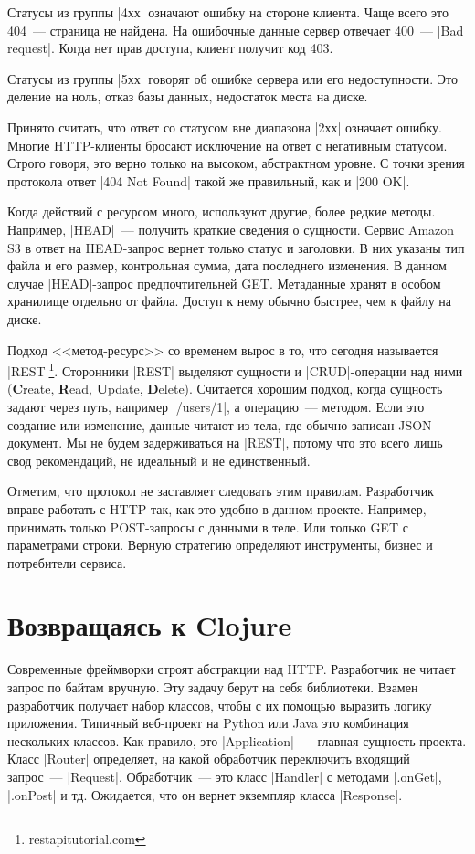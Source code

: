 Статусы из группы \spverb|4хх| означают ошибку на стороне клиента. Чаще всего это 404~---
страница не найдена. На ошибочные данные сервер отвечает 400~--- \spverb|Bad request|.
Когда нет прав доступа, клиент получит код 403.

Статусы из группы \spverb|5хх| говорят об ошибке сервера или его
недоступности. Это деление на ноль, отказ базы данных, недостаток места
на диске.

Принято считать, что ответ со статусом вне диапазона \spverb|2хх| означает
ошибку. Многие HTTP-клиенты бросают исключение на ответ с негативным статусом.
Строго говоря, это верно только на высоком, абстрактном уровне. С точки
зрения протокола ответ \spverb|404 Not Found| такой же правильный, как и \spverb|200 OK|.

Когда действий с ресурсом много, используют другие, более редкие
методы. Например, \spverb|HEAD|~--- получить краткие сведения о сущности. Сервис
Amazon S3 в ответ на HEAD-запрос вернет только статус и заголовки. В них указаны
тип файла и его размер, контрольная сумма, дата последнего изменения. В данном
случае \spverb|HEAD|-запрос предпочтительней GET. Метаданные хранят в особом
хранилище отдельно от файла. Доступ к нему обычно быстрее, чем к файлу на диске.

Подход <<метод-ресурс>> со временем вырос в то, что сегодня называется
\spverb|REST|\footnote{restapitutorial.com}. Сторонники
\spverb|REST| выделяют сущности и \spverb|CRUD|-операции над ними (\textbf{C}reate,
\textbf{R}ead, \textbf{U}pdate, \textbf{D}elete). Считается хорошим подход,
когда сущность задают через путь, например \spverb|/users/1|, а операцию~---
методом. Если это создание или изменение, данные читают из тела, где обычно записан
JSON-документ. Мы не будем задерживаться на \spverb|REST|, потому что это всего лишь
свод рекомендаций, не идеальный и не единственный.

Отметим, что протокол не заставляет следовать этим правилам. Разработчик вправе
работать с HTTP так, как это удобно в данном проекте. Например, принимать только
POST-запросы с данными в теле. Или только GET с параметрами строки. Верную
стратегию определяют инструменты, бизнес и потребители сервиса.

\section{Возвращаясь к Clojure}

Современные фреймворки строят абстракции над HTTP. Разработчик не читает запрос
по байтам вручную. Эту задачу берут на себя библиотеки. Взамен разработчик
получает набор классов, чтобы с их помощью выразить логику приложения. Типичный
веб-проект на Python или Java это комбинация нескольких классов. Как правило,
это \spverb|Application|~--- главная сущность проекта. Класс \spverb|Router|
определяет, на какой обработчик переключить входящий запрос~--- \spverb|Request|.
Обработчик~--- это класс \spverb|Handler| с методами \spverb|.onGet|,
\spverb|.onPost| и тд. Ожидается, что он вернет экземпляр класса \spverb|Response|.

